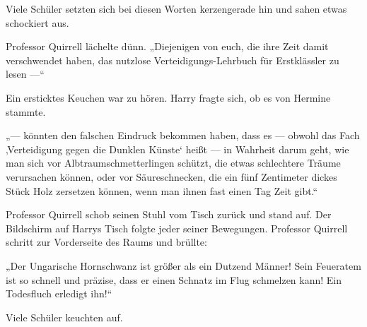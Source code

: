 Viele Schüler setzten sich bei diesen Worten kerzengerade hin und sahen etwas schockiert aus.

Professor Quirrell lächelte dünn.
„Diejenigen von euch, die ihre Zeit damit verschwendet haben, das nutzlose Verteidigungs-Lehrbuch für Erstklässler zu lesen —“

Ein ersticktes Keuchen war zu hören. Harry fragte sich, ob es von Hermine stammte.

„— könnten den falschen Eindruck bekommen haben, dass es — obwohl das Fach ‚Verteidigung gegen die Dunklen Künste‘ heißt — in Wahrheit darum geht, wie man sich vor Albtraumschmetterlingen schützt, die etwas schlechtere Träume verursachen können, oder vor Säureschnecken, die ein fünf Zentimeter dickes Stück Holz zersetzen können, wenn man ihnen fast einen Tag Zeit gibt.“

Professor Quirrell schob seinen Stuhl vom Tisch zurück und stand auf. Der Bildschirm auf Harrys Tisch folgte jeder seiner Bewegungen. Professor Quirrell schritt zur Vorderseite des Raums und brüllte:

„Der Ungarische Hornschwanz ist größer als ein Dutzend Männer! Sein Feueratem ist so schnell und präzise, dass er einen Schnatz im Flug schmelzen kann! Ein Todesfluch erledigt ihn!“

Viele Schüler keuchten auf.

